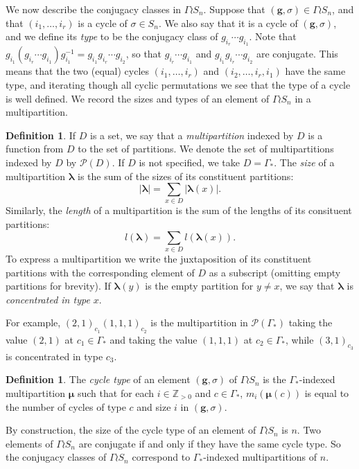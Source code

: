 \documentclass[10pt]{article}
\theoremstyle{definition}
\newtheorem{definition}[theorem]{Definition}
\newcommand{\bs}{\boldsymbol}
\begin{document}
We now describe the conjugacy classes in $\Gamma \wr S_n$. Suppose that $(\mathbf{g}, \sigma) \in \Gamma \wr S_n$, and that $(i_1, \ldots, i_r)$ is a cycle of $\sigma \in S_n$. We also say that it is a cycle of $(\mathbf{g}, \sigma)$, and we define its \emph{type} to be the conjugacy class of $g_{i_r} \cdots g_{i_1}$. Note that $g_{i_1}(g_{i_r} \cdots g_{i_1})g_{i_1}^{-1} = g_{i_1} g_{i_r}\cdots g_{i_2}$, so that $g_{i_r} \cdots g_{i_1}$ and $g_{i_1} g_{i_r} \cdots g_{i_2}$ are conjugate. This means that the two (equal) cycles $(i_1, \ldots, i_r)$ and $(i_2, \ldots, i_r, i_1)$ have the same type, and iterating though all cyclic permutations we see that the type of a cycle is well defined. We record the sizes and types of an element of $\Gamma \wr S_n$ in a multipartition.
\begin{definition}
If $D$ is a set, we say that a \emph{multipartition} indexed by $D$ is a function from $D$ to the set of partitions. We denote the set of multipartitions indexed by $D$ by $\mathcal{P}(D)$. If $D$ is not specified, we take $D = \Gamma_*$. The \emph{size} of a multipartition $\bs \lambda$ is the sum of the sizes of its constituent partitions:
\[
|\bs \lambda| = \sum_{x \in D} |\bs\lambda(x)|.
\]
Similarly, the \emph{length} of a multipartition is the sum of the lengths of its consituent partitions:
\[
l(\bs \lambda) = \sum_{x \in D} l(\bs\lambda(x)).
\]
To express a multipartition we write the juxtaposition of its constituent partitions with the corresponding element of $D$ as a subscript \textup{(}omitting empty partitions for brevity\textup{)}. If $\bs\lambda(y)$ is the empty partition for $y \neq x$, we say that $\bs\lambda$ is \emph{concentrated in type $x$}.
\end{definition}

For example, $(2,1)_{c_1} (1,1,1)_{c_2}$ is the multipartition in $\mathcal{P}(\Gamma_*)$ taking the value $(2,1)$ at $c_1 \in \Gamma_*$ and taking the value $(1,1,1)$ at $c_2 \in \Gamma_*$, while $(3,1)_{c_3}$ is concentrated in type $c_3$.
\begin{definition}
The \emph{cycle type} of an element $(\mathbf{g}, \sigma)$ of $\Gamma \wr S_n$ is the $\Gamma_*$-indexed multipartition $\bs \mu$ such that for each $i \in \mathbb{Z}_{>0}$ and $c \in \Gamma_*$, $m_i(\bs\mu(c))$ is equal to the number of cycles of type $c$ and size $i$ in $(\mathbf{g}, \sigma)$.
\end{definition}

By construction, the size of the cycle type of an element of $\Gamma \wr S_n$ is $n$. Two elements of $\Gamma \wr S_n$ are conjugate if and only if they have the same cycle type. So the conjugacy classes of $\Gamma \wr S_n$ correspond to $\Gamma_*$-indexed multipartitions of $n$.
\end{document}
